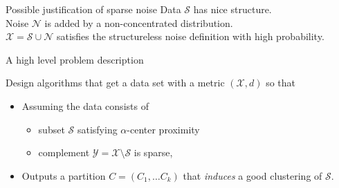 \documentclass{beamer}
\newcommand{\mc}{\mathcal}
\begin{document}
\begin{frame}{Possible justification of sparse noise}
	Data $\mc S$ has nice structure.\\
	\vspace{0.5cm} Noise $\mc N$ is added by a {\color{blue} non-concentrated} distribution.\\
	\pause
	\vspace{1cm} $\mc X = \mc S \cup \mc N$ satisfies the structureless noise definition with high probability.
\end{frame}

\begin{frame}{A high level problem description}

	Design algorithms that get a data set with a metric $(\mc X, d)$ so that
	\vspace{1cm}
	\begin{itemize}
		\item Assuming the data consists of 
		\begin{itemize}
		\vspace{0.5cm}
		\item subset $\mc S$ satisfying $\alpha$-center proximity 
		\vspace{0.5cm}
		\item complement $\mc Y= \mc X \setminus \mc S$ is sparse,
		\end{itemize}

		\vspace{1.5cm}
		\item Outputs a partition $C=(C_1, \ldots C_k)$ that \emph{induces} a good clustering of $\mc S$.
	\end{itemize}
\end{frame}
\end{document}
